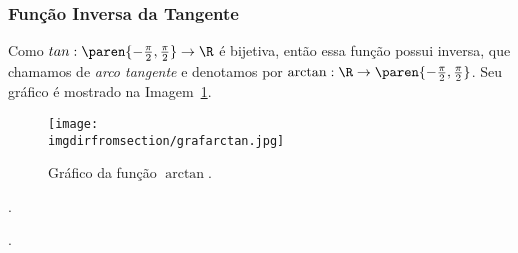 \subsubsection{Função Inversa da Tangente}

\begin{example}
Como $tan: \paren{- \frac {\pi} 2, \frac {\pi} 2} \to \R$ é
bijetiva, então essa função possui inversa, que chamamos de
\emph{arco tangente} e denotamos por $\arctan : \R \to
\paren{- \frac {\pi} 2, \frac {\pi} 2}$. Seu gráfico é mostrado na Imagem~\ref{img:grafico-arctan}.
%
\begin{figure}[H]
\centering
\texttt{[image: \\imgdirfromsection/grafarctan.jpg]}
\caption{Gráfico da função $\arctan$.}
\label{img:grafico-arctan}
\end{figure}
\end{example}

\begin{onlineact}
	.
\end{onlineact}

\begin{onlineact}
	.
\end{onlineact}